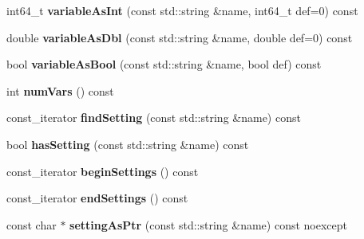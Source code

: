 \begin{DoxyCompactItemize}
\item 
\hypertarget{classtheoria_1_1util_1_1CommandLine_af68e2020ecd8b4134f2528656e8fa153}{int64\+\_\+t {\bfseries variable\+As\+Int} (const std\+::string \&name, int64\+\_\+t def=0) const }\label{classtheoria_1_1util_1_1CommandLine_af68e2020ecd8b4134f2528656e8fa153}

\item 
\hypertarget{classtheoria_1_1util_1_1CommandLine_a42a3db6b1feb7f896eff374a5aed3375}{double {\bfseries variable\+As\+Dbl} (const std\+::string \&name, double def=0) const }\label{classtheoria_1_1util_1_1CommandLine_a42a3db6b1feb7f896eff374a5aed3375}

\item 
\hypertarget{classtheoria_1_1util_1_1CommandLine_ae6bd242abec6b023d0223d852981aa1b}{bool {\bfseries variable\+As\+Bool} (const std\+::string \&name, bool def) const }\label{classtheoria_1_1util_1_1CommandLine_ae6bd242abec6b023d0223d852981aa1b}

\item 
\hypertarget{classtheoria_1_1util_1_1CommandLine_a5b13b7001972f9ab0732fd2f4cd3d72e}{int {\bfseries num\+Vars} () const }\label{classtheoria_1_1util_1_1CommandLine_a5b13b7001972f9ab0732fd2f4cd3d72e}

\item 
\hypertarget{classtheoria_1_1util_1_1CommandLine_a5f76cdc20c9ccc14783e4e909e9b0c26}{const\+\_\+iterator {\bfseries find\+Setting} (const std\+::string \&name) const }\label{classtheoria_1_1util_1_1CommandLine_a5f76cdc20c9ccc14783e4e909e9b0c26}

\item 
\hypertarget{classtheoria_1_1util_1_1CommandLine_ab0942305d8d8796f290e2e69359a4b05}{bool {\bfseries has\+Setting} (const std\+::string \&name) const }\label{classtheoria_1_1util_1_1CommandLine_ab0942305d8d8796f290e2e69359a4b05}

\item 
\hypertarget{classtheoria_1_1util_1_1CommandLine_a65111c6c102130a08bcf36db5d81bb43}{const\+\_\+iterator {\bfseries begin\+Settings} () const }\label{classtheoria_1_1util_1_1CommandLine_a65111c6c102130a08bcf36db5d81bb43}

\item 
\hypertarget{classtheoria_1_1util_1_1CommandLine_a0e8def4533dd6045e3f9ed55e2359f5b}{const\+\_\+iterator {\bfseries end\+Settings} () const }\label{classtheoria_1_1util_1_1CommandLine_a0e8def4533dd6045e3f9ed55e2359f5b}

\item 
\hypertarget{classtheoria_1_1util_1_1CommandLine_ad5b4089e23a04d31c3edcf3d659ab8d9}{const char $\ast$ {\bfseries setting\+As\+Ptr} (const std\+::string \&name) const noexcept}\label{classtheoria_1_1util_1_1CommandLine_ad5b4089e23a04d31c3edcf3d659ab8d9}


\end{DoxyCompactItemize}
